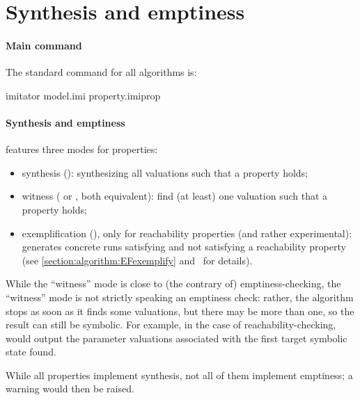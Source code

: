 \section{Synthesis and emptiness}

\paragraph{Main command}
The standard \imitator{} command for all algorithms is:

\begin{terminal}
imitator model.imi property.imiprop
\end{terminal}

\paragraph{Synthesis and emptiness}
\imitator{} features three modes for properties:

\begin{itemize}
	\item synthesis (): synthesizing all valuations such that a property holds;
	\item witness ( or , both equivalent): find (at least) one valuation such that a property holds;
	\item exemplification (), only for reachability properties (and rather experimental): generates concrete runs satisfying and not satisfying a reachability property (see \cref{section:algorithm:EFexemplify} and~\cite{AWUH22} for details).
\end{itemize}

While the ``witness'' mode is close to (the contrary of) emptiness-checking, the ``witness'' mode is not strictly speaking an emptiness check: rather, the algorithm stops as soon as it finds some valuations, but there may be more than one, so the result can still be symbolic.
For example, in the case of reachability-checking, \imitator{} would output the parameter valuations associated with the first target symbolic state found.


While all properties implement synthesis, not all of them implement emptiness; a warning would then be raised.


